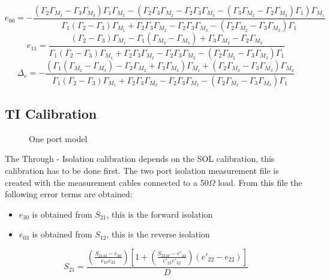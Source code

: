 	\small
	\begin{equation}
		e_{00} = -\frac{{\left(\Gamma_{2} \Gamma_{M_{3}} - \Gamma_{3} \Gamma_{M_{3}}\right)} \Gamma_{1} \Gamma_{M_{2}} - {\left(\Gamma_{2} \Gamma_{3} \Gamma_{M_{2}} - \Gamma_{2} \Gamma_{3} \Gamma_{M_{3}} - {\left(\Gamma_{3} \Gamma_{M_{2}} - \Gamma_{2} \Gamma_{M_{3}}\right)} \Gamma_{1}\right)} \Gamma_{M_{1}}}{\Gamma_{1} {\left(\Gamma_{2} - \Gamma_{3}\right)} \Gamma_{M_{1}} + \Gamma_{2} \Gamma_{3} \Gamma_{M_{2}} - \Gamma_{2} \Gamma_{3} \Gamma_{M_{3}} - {\left(\Gamma_{2} \Gamma_{M_{2}} - \Gamma_{3} \Gamma_{M_{3}}\right)} \Gamma_{1}}		
	\end{equation}
	\begin{equation}
	e_{11} = \frac{{\left(\Gamma_{2} - \Gamma_{3}\right)} \Gamma_{M_{1}} - \Gamma_{1} {\left(\Gamma_{M_{2}} - \Gamma_{M_{3}}\right)} + \Gamma_{3} \Gamma_{M_{2}} - \Gamma_{2} \Gamma_{M_{3}}}{\Gamma_{1} {\left(\Gamma_{2} - \Gamma_{3}\right)} \Gamma_{M_{1}} + \Gamma_{2} \Gamma_{3} \Gamma_{M_{2}} - \Gamma_{2} \Gamma_{3} \Gamma_{M_{3}} - {\left(\Gamma_{2} \Gamma_{M_{2}} - \Gamma_{3} \Gamma_{M_{3}}\right)} \Gamma_{1}}
	\end{equation}
	\begin{equation}
	 \Delta_{e} = -\frac{{\left(\Gamma_{1} {\left(\Gamma_{M_{2}} - \Gamma_{M_{3}}\right)} - \Gamma_{2} \Gamma_{M_{2}} + \Gamma_{3} \Gamma_{M_{3}}\right)} \Gamma_{M_{1}} + {\left(\Gamma_{2} \Gamma_{M_{3}} - \Gamma_{3} \Gamma_{M_{3}}\right)} \Gamma_{M_{2}}}{\Gamma_{1} {\left(\Gamma_{2} - \Gamma_{3}\right)} \Gamma_{M_{1}} + \Gamma_{2} \Gamma_{3} \Gamma_{M_{2}} - \Gamma_{2} \Gamma_{3} \Gamma_{M_{3}} - {\left(\Gamma_{2} \Gamma_{M_{2}} - \Gamma_{3} \Gamma_{M_{3}}\right)} \Gamma_{1}}
	\end{equation}
	\normalsize
	
\subsection{TI Calibration}

\begin{figure}[H]
	\centering
	
	\caption{One port model}
	\label{fig:twoportmodel}
\end{figure}
The Through - Isolation calibration depends on the SOL calibration, this calibration has to be done first. The two port isolation measurement file is created with the measurement cables connected to a 50$\Omega$ load. From this file the following error terms are obtained:
\begin{itemize}
	\item $e_{30}$ is obtained from $S_{21}$, this is the forward isolation
	\item $e_{03}$ is obtained from $S_{12}$, this is the reverse isolation
\end{itemize}
\small
\begin{equation}
S_{21}=\frac{\left( \frac{S_{21M}-e_{30}}{e_{10}e_{32}}\right)\left[1+\left(\frac{S_{22M}-e'_{33}}{e'_{23}e'_{32}}\right)\left(e'_{22}-e_{22}\right)\right]}{D}
\end{equation}

